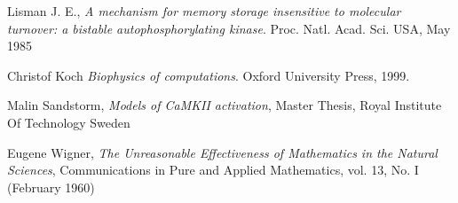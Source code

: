 \documentclass[]{resonance}
\begin{document}
\begin{thebibliography}{99} 
    Lisman J. E., 
    \textit{A mechanism for memory storage insensitive to molecular turnover: a
    bistable autophosphorylating kinase}. 
    Proc. Natl. Acad. Sci. USA, May 1985

    Christof Koch
    \textit{Biophysics of computations}.
    Oxford University Press, 1999.

    Malin Sandstorm,
    \textit{Models of CaMKII activation},
    Master Thesis, Royal Institute Of Technology Sweden 

    Eugene Wigner,
    \textit{The Unreasonable Effectiveness of Mathematics in the Natural Sciences},
     Communications in Pure and Applied Mathematics, vol. 13, No. I (February 1960)


\end{thebibliography}
\end{document}
